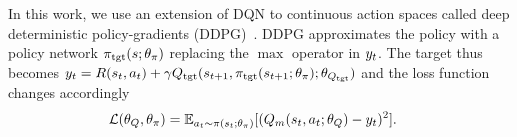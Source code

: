 In this work, we use an extension of DQN to continuous action spaces called
deep deterministic policy-gradients
(DDPG)~\citep{lillicrap2015continuous}. DDPG approximates the
policy with a policy network $\pi_{\text{tgt}}(s; \theta_\pi)$ replacing the $\max$
operator in $y_t$. The target thus becomes 
$ y_t = R(s_t, a_t) + \gamma
Q_{\text{tgt}}(s_{t+1}, \pi_{\text{tgt}}(s_{t+1}; \theta_\pi); \theta_{Q_{\text{tgt}}}) $ and the
loss function changes accordingly
%
\newcommand{\policytgt}{\policy_\text{tgt}}%
\begin{align}
  \mathcal{L}(\theta_Q, \theta_\pi) &= \mathbb{E}_{a_t \sim \pi(s_t; \theta_\pi)}[
                                      (Q_m(s_t, a_t; \theta_Q) - y_t)^2].
\end{align}
%



